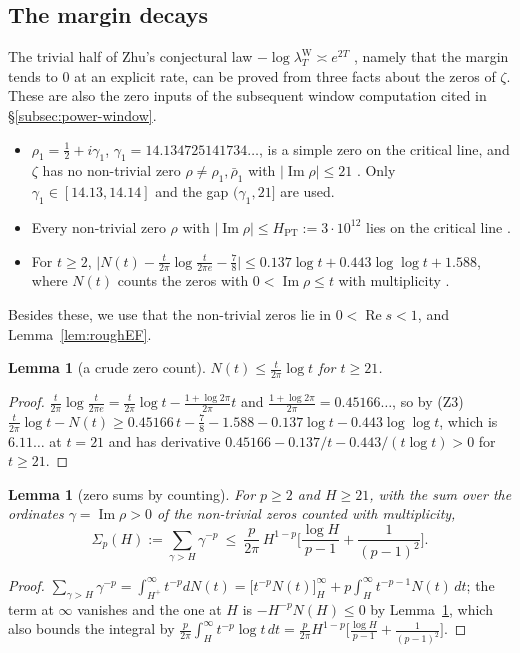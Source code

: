 \documentclass[11pt]{amsart}
\newtheorem{lemma}[theorem]{Lemma}
\theoremstyle{definition}
\theoremstyle{remark}
\newcommand{\Rel}{\operatorname{Re}}
\newcommand{\Iml}{\operatorname{Im}}
\newcommand{\lamW}{\lambda^{\mathrm W}_T}
\begin{document}
\subsection{The margin decays}\label{subsec:margin}
The trivial half of Zhu's conjectural law $-\log\lamW\asymp e^{2T}$ \cite[Conj.~12.1]{Zhu2026}, namely that
the margin tends to $0$ at an explicit rate, can be proved from three facts about the zeros of $\zeta$.
These are also the zero inputs of the subsequent window computation cited in
\S\ref{subsec:power-window}.
\begin{itemize}
\item[(Z1)] $\rho_1=\frac12+i\gamma_1$, $\gamma_1=14.134725141734\ldots$, is a simple zero on the critical line,
and $\zeta$ has no non-trivial zero $\rho\ne\rho_1,\bar\rho_1$ with $|\Iml\rho|\le21$
\cite{RosserYoheSchoenfeld1968,PlattTrudgian2021}. Only $\gamma_1\in[14.13,14.14]$ and the gap $(\gamma_1,21]$
are used.
\item[(Z2)] Every non-trivial zero $\rho$ with $|\Iml\rho|\le H_{\mathrm{PT}}:=3\cdot10^{12}$ lies on the
critical line \cite{PlattTrudgian2021}.
\item[(Z3)] For $t\ge2$, $\big|N(t)-\frac t{2\pi}\log\frac t{2\pi e}-\frac78\big|\le0.137\log t+0.443\log\log t+1.588$,
where $N(t)$ counts the zeros with $0<\Iml\rho\le t$ with multiplicity \cite[Thm.~19]{Rosser1941}.
\end{itemize}
Besides these, we use that the non-trivial zeros lie in $0<\Rel s<1$, and Lemma~\ref{lem:roughEF}.
\begin{lemma}[a crude zero count]\label{lem:Ncount}
$N(t)\le\frac t{2\pi}\log t$ for $t\ge21$.
\end{lemma}
\begin{proof}
$\frac t{2\pi}\log\frac t{2\pi e}=\frac t{2\pi}\log t-\frac{1+\log2\pi}{2\pi}t$ and
$\frac{1+\log2\pi}{2\pi}=0.45166\ldots$, so by (Z3)
$\frac t{2\pi}\log t-N(t)\ge0.45166\,t-\frac78-1.588-0.137\log t-0.443\log\log t$, which is $6.11\ldots$ at
$t=21$ and has derivative $0.45166-0.137/t-0.443/(t\log t)>0$ for $t\ge21$.
\end{proof}

\begin{lemma}[zero sums by counting]\label{lem:zerosum}
For $p\ge2$ and $H\ge21$, with the sum over the ordinates $\gamma=\Iml\rho>0$ of the non-trivial zeros
counted with multiplicity,
\[
\Sigma_p(H):=\sum_{\gamma>H}\gamma^{-p}\ \le\ \frac p{2\pi}\,H^{1-p}\Big[\frac{\log H}{p-1}+\frac1{(p-1)^2}\Big].
\]
\end{lemma}
\begin{proof}
$\sum_{\gamma>H}\gamma^{-p}=\int_{H^+}^\infty t^{-p}dN(t)=\big[t^{-p}N(t)\big]_H^\infty+p\int_H^\infty t^{-p-1}N(t)\,dt$;
the term at $\infty$ vanishes and the one at $H$ is $-H^{-p}N(H)\le0$ by Lemma~\ref{lem:Ncount}, which
also bounds the integral by $\frac p{2\pi}\int_H^\infty t^{-p}\log t\,dt=\frac p{2\pi}H^{1-p}\big[\frac{\log H}{p-1}+\frac1{(p-1)^2}\big]$.
\end{proof}
\end{document}
